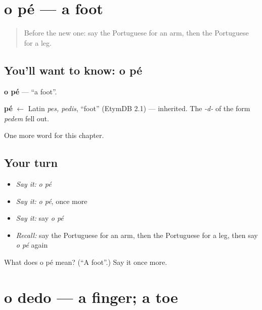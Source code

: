 \section[o pé]{o pé — a foot}

\label{lesson:PT-C30-pe}



\begin{quote}
Before the new one: say the Portuguese for an arm, then the Portuguese for a leg.
\end{quote}

\subsection*{You'll want to know: o pé}
\textbf{o pé} — \textquotedblleft{}a foot\textquotedblright{}.

\begin{cousinweb}
\textbf{pé} $\leftarrow$ Latin \emph{pes, pedis}, \textquotedblleft{}foot\textquotedblright{} (EtymDB 2.1) — inherited. The \emph{-d-} of the form \emph{pedem} fell out.
\end{cousinweb}

\begin{grammarlens}[title={What you've built}]
One more word for this chapter.
\end{grammarlens}

\subsection*{Your turn}
\begin{itemize}
\raggedright
  \item \emph{Say it:} \emph{o pé}
  \item \emph{Say it:} \emph{o pé}, once more
  \item \emph{Say it:} say \emph{o pé}
  \item \emph{Recall:} say the Portuguese for an arm, then the Portuguese for a leg, then say \emph{o pé} again
\end{itemize}

\begin{tcolorbox}[breakable,colback=teal!4,colframe=teal!35!black,title={Before you move on}]
What does o pé mean? (\textquotedblleft{}A foot\textquotedblright{}.) Say it once more.
\end{tcolorbox}
\section[o dedo]{o dedo — a finger; a toe}

